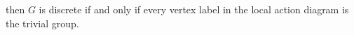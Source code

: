 \documentclass[preview]{standalone}
\begin{document}
\begin{center}
then $G$ is discrete if and only if every vertex label in the local action diagram is the trivial group.
\end{center}
\end{document}

